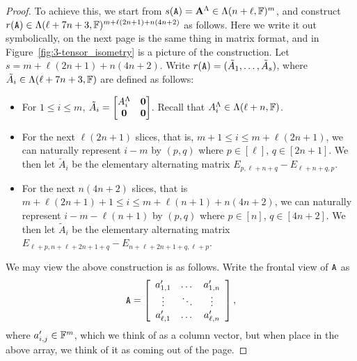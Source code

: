 \documentclass[11pt]{article}
\begin{document}
\begin{proof}
To achieve this, we start from $s(\mathtt{A})=\mathbf{A}^{\Lambda} \in\Lambda(n+\ell, \mathbb{F})^m$, and construct 
$r(\mathtt{A}) \in \Lambda(\ell+7n+3, \mathbb{F})^{m+\ell(2n+1)+n(4n+2)}$ as follows. 
Here we write it out symbolically, on the next page is the same thing in matrix 
format, and in Figure~\ref{fig:3-tensor_isometry} is a picture of the construction.
Let 
$s=m+\ell(2n+1)+n(4n+2)$. Write $r(\mathtt{A})=(\tilde A_1, \dots, \tilde A_s)$, 
where 
$\tilde A_i\in\Lambda(\ell+7n+3, \mathbb{F})$ are defined as follows:
\begin{itemize}
\item For $1\leq i\leq m$, $\tilde A_i=\begin{bmatrix} A_i^{\Lambda} & \mathbf{0} \\ \mathbf{0} & 
\mathbf{0} \end{bmatrix}$. Recall that $A_i^{\Lambda} \in \Lambda(\ell+n, \mathbb{F})$.
\item For the next $\ell(2n+1)$ slices, that is, 
$m+1\leq i\leq m+\ell(2n+1)$, we can naturally represent $i-m$ by $(p, 
q)$ where 
$p\in[\ell]$, $q\in [2n+1]$. We then let $\tilde A_i$ be the elementary 
alternating 
matrix $E_{p,\ell+n+q} - E_{\ell+n+q,p}$.

\item For the next $n(4n+2)$ slices, that is
$m+\ell(2n+1)+1\leq i\leq m+\ell(n+1)+n(4n+2)$, we can naturally 
represent $i-m-\ell(n+1)$ by $(p, q)$ where $p\in[n]$, $q\in[4n+2]$. We then let 
$\tilde A_i$ be the elementary alternating matrix  $E_{\ell+p, n+\ell+2n+1+q} - E_{n+\ell+2n+1+q, \ell+p}$. 
\end{itemize}

We may view the above construction is as follows. 
Write the frontal view of $\mathtt{A}$ as 
\[
\mathtt{A} = \left[ \begin{array}{ccc}
a_{1,1}' & \dots & a_{1,n}'\\
\vdots & \ddots & \vdots \\
a_{\ell, 1}' & \dots & a_{\ell, n}'\\ 
\end{array}\right],
\]
where $a_{i,j}'\in \mathbb{F}^m$, 
which we think of as a column vector, but when place in the above array, we think 
of it as coming out of the page.


\end{proof}
\end{document}
